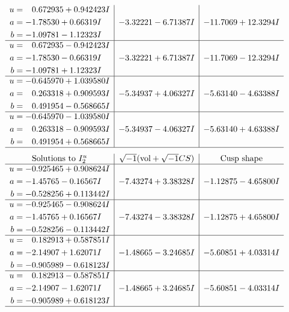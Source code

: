 \documentclass[1p]{elsarticle_modified}
\theoremstyle{definition}
\newcommand{\I}{\sqrt{-1}}
\begin{document}
$$\begin{array}{c|c|c}
\begin{aligned}
u &= \phantom{-}0.672935 + 0.942423 I \\
a &= -1.78530 + 0.66319 I \\
b &= -1.09781 - 1.12323 I\end{aligned}
 & -3.32221 - 6.71387 I & -11.7069 + 12.3294 I \\ \hline\begin{aligned}
u &= \phantom{-}0.672935 - 0.942423 I \\
a &= -1.78530 - 0.66319 I \\
b &= -1.09781 + 1.12323 I\end{aligned}
 & -3.32221 + 6.71387 I & -11.7069 - 12.3294 I \\ \hline\begin{aligned}
u &= -0.645970 + 1.039580 I \\
a &= \phantom{-}0.263318 + 0.909593 I \\
b &= \phantom{-}0.491954 - 0.568665 I\end{aligned}
 & -5.34937 + 4.06327 I & -5.63140 - 4.63388 I \\ \hline\begin{aligned}
u &= -0.645970 - 1.039580 I \\
a &= \phantom{-}0.263318 - 0.909593 I \\
b &= \phantom{-}0.491954 + 0.568665 I\end{aligned}
 & -5.34937 - 4.06327 I & -5.63140 + 4.63388 I\\
 \hline 
 \end{array}$$\newpage$$\begin{array}{c|c|c}  
\text{Solutions to }I^u_{2}& \I (\text{vol} + \sqrt{-1}CS) & \text{Cusp shape}\\
 \hline 
\begin{aligned}
u &= -0.925465 + 0.908624 I \\
a &= -1.45765 - 0.16567 I \\
b &= -0.528256 + 0.113442 I\end{aligned}
 & -7.43274 + 3.38328 I & -1.12875 - 4.65800 I \\ \hline\begin{aligned}
u &= -0.925465 - 0.908624 I \\
a &= -1.45765 + 0.16567 I \\
b &= -0.528256 - 0.113442 I\end{aligned}
 & -7.43274 - 3.38328 I & -1.12875 + 4.65800 I \\ \hline\begin{aligned}
u &= \phantom{-}0.182913 + 0.587851 I \\
a &= -2.14907 + 1.62071 I \\
b &= -0.905989 - 0.618123 I\end{aligned}
 & -1.48665 - 3.24685 I & -5.60851 + 4.03314 I \\ \hline\begin{aligned}
u &= \phantom{-}0.182913 - 0.587851 I \\
a &= -2.14907 - 1.62071 I \\
b &= -0.905989 + 0.618123 I\end{aligned}
 & -1.48665 + 3.24685 I & -5.60851 - 4.03314 I\\
 \hline 
 \end{array}$$\newpage
\end{document}
